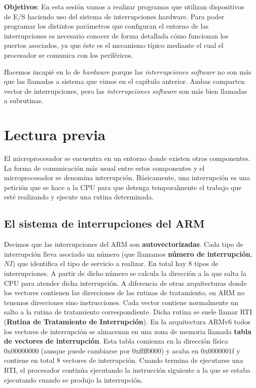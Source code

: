 \label{chp:Interrupciones}
\minitoc

{\bf Objetivos}: En esta sesión vamos a realizar programas que
utilizan dispositivos de E/S haciendo uso del sistema de
interrupciones hardware. Para poder programar los distintos parámetros
que configuran el entorno de las interrupciones es necesario conocer de
forma detallada cómo funcionan los puertos asociados, ya que
éste es el mecanismo típico mediante el cual el procesador se
comunica con los periféricos.

Hacemos incapié en lo de {\it hardware} porque las
{\it interrupciones software} no son más que las llamadas a sistema
que vimos en el capítulo anterior. Ambas comparten vector de interrupciones,
pero las {\it interrupciones software} son más bien llamadas a subrutinas.

\section{Lectura previa}

El microprocesador se encuentra en un entorno donde existen otros
componentes. La forma de comunicación más usual entre estos
componentes y el microprocesador se denomina interrupción.
Básicamente, una interrupción es una petición que se hace a la CPU
para que detenga temporalmente el trabajo que esté realizando y
ejecute una rutina determinada. 

\subsection{El sistema de interrupciones del ARM}

Decimos que las interrupciones del ARM son {\bf autovectorizadas}.
Cada tipo de interrupción lleva asociado un número (que llamamos
{\bf número de interrupción}, $NI$) que identifica el tipo de servicio a
realizar. En total hay 8 tipos de interrupciones.
A partir de dicho número se calcula la dirección a la que salta la CPU
para atender dicha interrupción. A diferencia de otras arquitecturas
donde los vectores contienen las direcciones de las rutinas de
tratamiento, en ARM no tenemos direcciones sino instrucciones. Cada vector
contiene normalmente un salto a la rutina de tratamiento correspondiente.
Dicha rutina se suele llamar RTI ({\bf Rutina
de Tratamiento de Interrupción}). En la arquitectura ARMv6
todos los vectores de interrupción se almacenan en una zona de memoria
llamada {\bf tabla de vectores de interrupción}. Esta tabla comienza
en la dirección física 0x00000000 (aunque puede cambiarse por
0xffff0000) y acaba en 0x0000001f y contiene en total 8 vectores de
interrupción. Cuando termina de ejecutarse una RTI,
el procesador continúa ejecutando la instrucción siguiente a la que se
estaba ejecutando cuando se produjo la interrupción.

